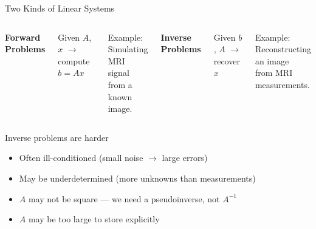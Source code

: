\documentclass[aspectratio=169]{beamer}
\begin{document}
\begin{frame}{Two Kinds of Linear Systems}
    \begin{columns}[T]
        \centering
        \textbf{Forward Problems}
        \vspace{0.3cm}

        Given $A$, $x$ $\longrightarrow$ compute $b = Ax$

        \vspace{0.3cm}

        \vspace{0.5cm}
        \footnotesize
        Example: Simulating MRI signal\\
        from a known image.

        \centering
        \textbf{Inverse Problems}
        \vspace{0.3cm}

        Given $b$, $A$ $\longrightarrow$ recover $x$

        \vspace{0.3cm}

        \vspace{0.5cm}
        \footnotesize
        Example: Reconstructing an image\\
        from MRI measurements.

    \end{columns}

    \vspace{0.3cm}
    \pause
    \begin{alertblock}{Inverse problems are harder}
        \begin{itemize}
            \item Often ill-conditioned (small noise $\to$ large errors)
            \item May be underdetermined (more unknowns than measurements)
            \item $A$ may not be square --- we need a pseudoinverse, not $A^{-1}$
            \item $A$ may be too large to store explicitly
        \end{itemize}
    \end{alertblock}
\end{frame}
\end{document}
